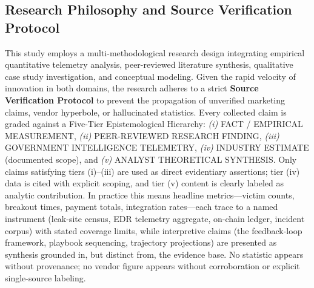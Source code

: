 \documentclass[conference,10pt,twocolumn,a4paper]{IEEEtran}
\begin{document}
\subsection{Research Philosophy and Source Verification Protocol}
This study employs a multi-methodological research design integrating empirical quantitative telemetry analysis, peer-reviewed literature synthesis, qualitative case study investigation, and conceptual modeling. Given the rapid velocity of innovation in both domains, the research adheres to a strict \textbf{Source Verification Protocol} to prevent the propagation of unverified marketing claims, vendor hyperbole, or hallucinated statistics. Every collected claim is graded against a Five-Tier Epistemological Hierarchy: \emph{(i)} FACT / EMPIRICAL MEASUREMENT, \emph{(ii)} PEER-REVIEWED RESEARCH FINDING, \emph{(iii)} GOVERNMENT INTELLIGENCE TELEMETRY, \emph{(iv)} INDUSTRY ESTIMATE (documented scope), and \emph{(v)} ANALYST THEORETICAL SYNTHESIS. Only claims satisfying tiers (i)--(iii) are used as direct evidentiary assertions; tier (iv) data is cited with explicit scoping, and tier (v) content is clearly labeled as analytic contribution. In practice this means headline metrics---victim counts, breakout times, payment totals, integration rates---each trace to a named instrument (leak-site census, EDR telemetry aggregate, on-chain ledger, incident corpus) with stated coverage limits, while interpretive claims (the feedback-loop framework, playbook sequencing, trajectory projections) are presented as synthesis grounded in, but distinct from, the evidence base. No statistic appears without provenance; no vendor figure appears without corroboration or explicit single-source labeling.
\end{document}

